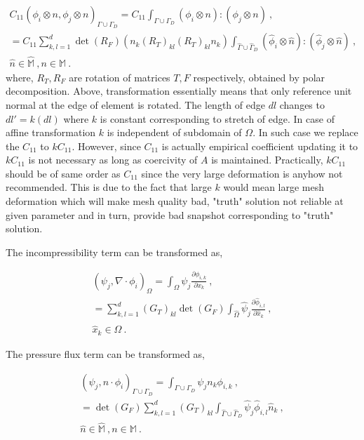\documentclass[a4paper,oneside,openright,spanish,english]{book}
\begin{document}
\begin{equation}\label{affine_coercivity_term}
\begin{split}
C_{11}(\phi_i \otimes n,\phi_j \otimes n)_{\Gamma \cup \Gamma_D} = C_{11} \int_{\Gamma \cup \Gamma_D} (\phi_i \otimes n) : (\phi_j \otimes n) \ , \\
= C_{11}\sum_{k,l=1}^{d} \det(R_F) (n_k (R_T)_{kl} (R_T)_{kl} n_k) \int_{\hat{\Gamma} \cup \hat{\Gamma}_D} (\hat{\phi}_i \otimes \hat{n}) : (\hat{\phi}_j \otimes \hat{n}) \ , \\
\hat{n} \in \hat{\mathbb{M}} \ , n \in \mathbb{M} \ .
\end{split}
\end{equation}
where, $R_T,R_F$ are rotation of matrices $T,F$ respectively, obtained by polar decomposition. 
Above, transformation essentially means that only reference unit normal at the edge of element is rotated. The length of edge $dl$ changes to $dl'=k(dl)$ where $k$ is constant corresponding to stretch of edge. In case of affine transformation $k$ is independent of subdomain of $\Omega$. In such case we replace the $C_{11}$ to $kC_{11}$. However, since $C_11$ is actually empirical coefficient updating it to $kC_{11}$ is not necessary as long as coercivity of $A$ is maintained. Practically, $kC_{11}$ should be of same order as $C_{11}$ since the very large deformation is anyhow not recommended. This is due to the fact that large $k$ would mean large mesh deformation which will make mesh quality bad, "truth" solution not reliable at given parameter and in turn, provide bad snapshot corresponding to "truth" solution.


The incompressibility term can be transformed as,

\begin{equation}\label{affine_incompressibility_term}
\begin{split}
(\psi_j, \nabla \cdot \phi_i)_{\Omega} = \int_{\Omega} \psi_j \frac{\partial \phi_{i,k}}{\partial x_k} \ , \\
= \sum_{k,l=1}^{d} (G_T)_{kl} \det(G_F) \int_{\hat{\Omega}} \hat{\psi}_j \frac{\partial \hat{\phi}_{i,l}}{\partial \hat{x}_k} \ , \\
\hat{x}_k \in \hat{\Omega} \ .
\end{split}
\end{equation}

The pressure flux term can be transformed as,

\begin{equation}\label{affine_pressure_flux_term}
\begin{split}
(\psi_j,n \cdot \phi_i)_{\Gamma \cup \Gamma_D} = \int_{\Gamma \cup \Gamma_D} \psi_j n_k \phi_{i,k} \ , \\
 = \det(G_F) \sum_{k,l=1}^{d} (G_T)_{kl} \int_{\hat{\Gamma} \cup \hat{\Gamma}_D} \hat{\psi}_j \hat{\phi}_{i,l} \hat{n}_k \ , \\
\hat{n} \in \hat{\mathbb{M}} \ , n \in \mathbb{M} \ .
\end{split}
\end{equation}
\end{document}
